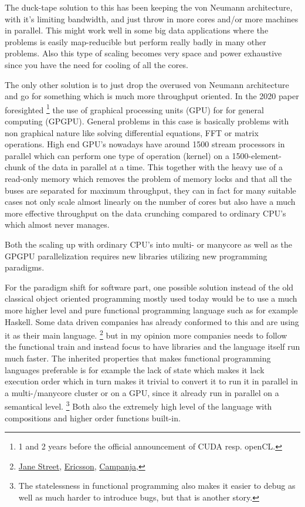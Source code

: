 \documentclass{article}
\begin{document}
    The duck-tape solution to this has been keeping the von Neumann
    architecture, with it's limiting bandwidth, and just throw in more cores and/or more machines in parallel.
    This might work well in some big data applications where the problems is easily
    map-reducible but perform really badly in many other
    problems.\cite{mapreduce} Also
    this type of scaling becomes very space and power exhaustive since you have the need for
    cooling of all the cores. 

    The only other solution is to just drop the overused von Neumann architecture
    and go for something which is much more throughput oriented. In the 2020
    paper\cite{ms2020} foresighted
    \footnote{1 and 2 years before the official 
    announcement of CUDA resp. openCL.} 
    the use of graphical processing units (GPU) for
    for general computing (GPGPU). General problems in this case is basically 
    problems with non graphical nature like
    solving differential equations, FFT or matrix operations. 
    High end GPU's nowadays have around
    1500 stream processors in parallel which can perform one type of
    operation
    (kernel)
    on a 1500-element-chunk of the data in parallel at a time. This together
    with the heavy use 
    of a read-only memory which removes the problem of memory locks
    and that all the buses are separated for
    maximum throughput, they can in fact for many suitable cases not only scale almost linearly 
    on the number of cores but also have a much more effective throughput on
    the data crunching compared to ordinary CPU's which almost never manages.

    Both the scaling up with ordinary CPU's into multi- or manycore as well as
    the GPGPU parallelization requires new libraries utilizing new programming paradigms.

    For the paradigm shift for software part,
    one possible solution instead of the old classical object oriented
    programming mostly used today would be to use a much more higher level and
    pure functional programming language such as
    for example Haskell. Some data driven companies has
    already conformed to this and are using it as their main language.
    \footnote{
        \href{http://www.janestreet.com}{Jane Street},
        \href{http://www.ericsson.com}{Ericsson},
        \href{http://www.campanja.com}{Campanja},
    }
    but in my opinion more companies needs to follow the functional train and
    instead focus to have libraries and the language itself run much faster.
    The inherited properties that makes functional programming languages 
    preferable is for example the lack of state 
    which makes it lack execution order which in turn makes it
    trivial to convert it to run it in parallel in a multi-/manycore cluster
    or on a GPU, since it already run in parallel on a semantical level.
    \footnote{The
    statelessness in functional programming also makes it easier to debug as
well as much harder to introduce bugs, but that is another story.} 
    Both also the extremely high level of the language with
    compositions and higher order functions built-in.\cite{haskell}
\end{document}
